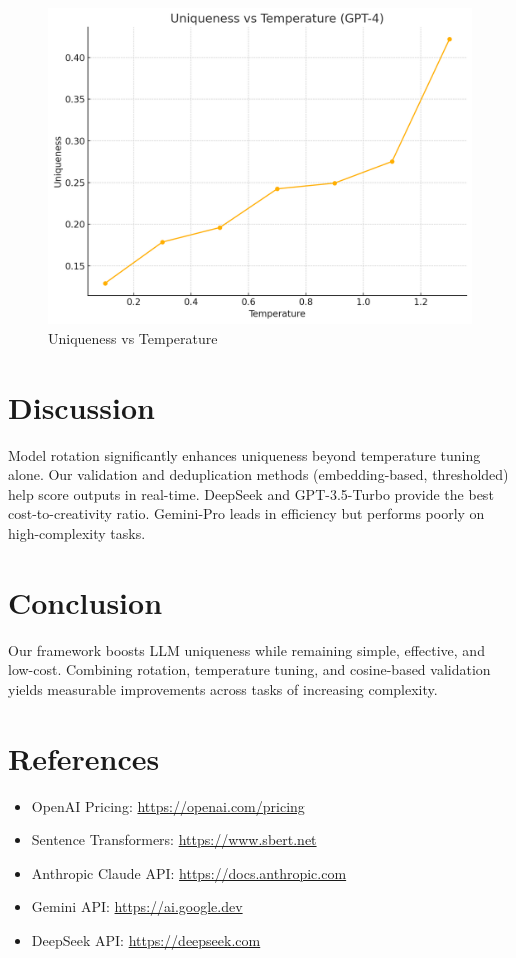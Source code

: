 \documentclass{article}
\begin{document}
  \begin{figure}[h!]
    \centering
    \includegraphics[width=0.75\linewidth]{uniqueness_vs_temperature.png}
    \caption{Uniqueness vs Temperature}
    \label{fig:uniqueness_vs_temperature}
  \end{figure}
\section{Discussion}
Model rotation significantly enhances uniqueness beyond temperature tuning alone. Our validation and deduplication methods (embedding-based, thresholded) help score outputs in real-time. DeepSeek and GPT-3.5-Turbo provide the best cost-to-creativity ratio. Gemini-Pro leads in efficiency but performs poorly on high-complexity tasks.

\section{Conclusion}
Our framework boosts LLM uniqueness while remaining simple, effective, and low-cost. Combining rotation, temperature tuning, and cosine-based validation yields measurable improvements across tasks of increasing complexity.

\section*{References}
\begin{itemize}
  \item OpenAI Pricing: \url{https://openai.com/pricing}
  \item Sentence Transformers: \url{https://www.sbert.net}
  \item Anthropic Claude API: \url{https://docs.anthropic.com}
  \item Gemini API: \url{https://ai.google.dev}
  \item DeepSeek API: \url{https://deepseek.com}
\end{itemize}
\end{document}
